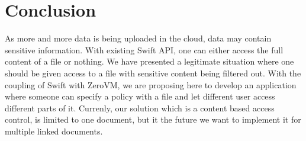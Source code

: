 \section{Conclusion}
As more and more data is being uploaded in the cloud,  data may contain sensitive information. With existing Swift API, one can either access the full content of a file or nothing. We have presented a legitimate situation where one should be given access to a  file with sensitive content being filtered out.  With the coupling of Swift with ZeroVM, we are proposing here to develop an application where someone can specify a policy with a file and let different user access different parts of it. Currenly, our solution which is a content based access control,  is limited to one document, but it the future we want to implement it for multiple linked documents.